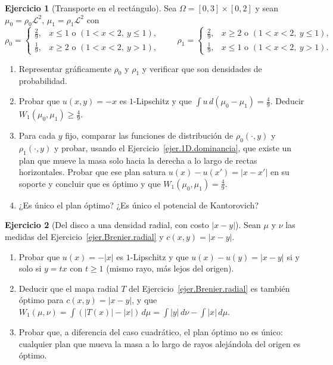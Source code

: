 \documentclass[12pt, a4paper]{amsbook}
\newcommand{\LL}{{\mathcal L}}
\theoremstyle{remark}
\theoremstyle{definition}
\newtheorem{ejercicio}{Ejercicio}[chapter]
\numberwithin{section}{chapter}
\numberwithin{subsection}{section}
\numberwithin{equation}{section}
\numberwithin{figure}{chapter}
\begin{document}
\begin{ejercicio}[Transporte en el rectángulo]\label{ejer.KR.rectangulo}
Sea $\Omega=[0,3]\times[0,2]$ y sean $\mu_0=\rho_0\LL^2$, $\mu_1=\rho_1\LL^2$
con
\[
\rho_0=\begin{cases}\tfrac29,&x\le1\text{ o }(1<x<2,\ y\le1),\\[2pt]
\tfrac19,&x\ge2\text{ o }(1<x<2,\ y>1),\end{cases}
\qquad
\rho_1=\begin{cases}\tfrac29,&x\ge2\text{ o }(1<x<2,\ y\le1),\\[2pt]
\tfrac19,&x\le1\text{ o }(1<x<2,\ y>1).\end{cases}
\]
\begin{enumerate}[label=(\alph*)]
\item Representar gráficamente $\rho_0$ y $\rho_1$ y verificar que son
densidades de probabilidad.
\item Probar que $u(x,y)=-x$ es $1$-Lipschitz y que
$\int u\,d(\mu_0-\mu_1)=\tfrac49$. Deducir $W_1(\mu_0,\mu_1)\ge\tfrac49$.
\item Para cada $y$ fijo, comparar las funciones de distribución de
$\rho_0(\cdot,y)$ y $\rho_1(\cdot,y)$ y probar, usando el
Ejercicio~\ref{ejer.1D.dominancia}, que existe un plan que mueve la masa
solo hacia la derecha a lo largo de rectas horizontales. Probar que ese
plan satura $u(x)-u(x')=|x-x'|$ en su soporte y concluir que es óptimo y que
$W_1(\mu_0,\mu_1)=\tfrac49$.
\item ¿Es único el plan óptimo? ¿Es único el potencial de Kantorovich?
\end{enumerate}
\end{ejercicio}

\begin{ejercicio}[Del disco a una densidad radial, con costo $|x-y|$]\label{ejer.KR.radial}
Sean $\mu$ y $\nu$ las medidas del Ejercicio~\ref{ejer.Brenier.radial} y
$c(x,y)=|x-y|$.
\begin{enumerate}[label=(\alph*)]
\item Probar que $u(x)=-|x|$ es $1$-Lipschitz y que $u(x)-u(y)=|x-y|$ si y
solo si $y=tx$ con $t\ge1$ (mismo rayo, más lejos del origen).
\item Deducir que el mapa radial $T$ del Ejercicio~\ref{ejer.Brenier.radial}
es también óptimo para $c(x,y)=|x-y|$, y que
$W_1(\mu,\nu)=\int(|T(x)|-|x|)\,d\mu=\int|y|\,d\nu-\int|x|\,d\mu$.
\item Probar que, a diferencia del caso cuadrático, el plan óptimo no es
único: cualquier plan que mueva la masa a lo largo de rayos alejándola del
origen es óptimo.
\end{enumerate}
\end{ejercicio}
\end{document}
